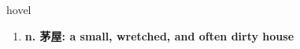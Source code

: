 
\begin{frame}
{\huge hovel}
\begin{center}
\begin{enumerate}\Large
  \item \textbf{n. 茅屋: a small, wretched, and often dirty house}
\end{enumerate}
\end{center}
\end{frame}
